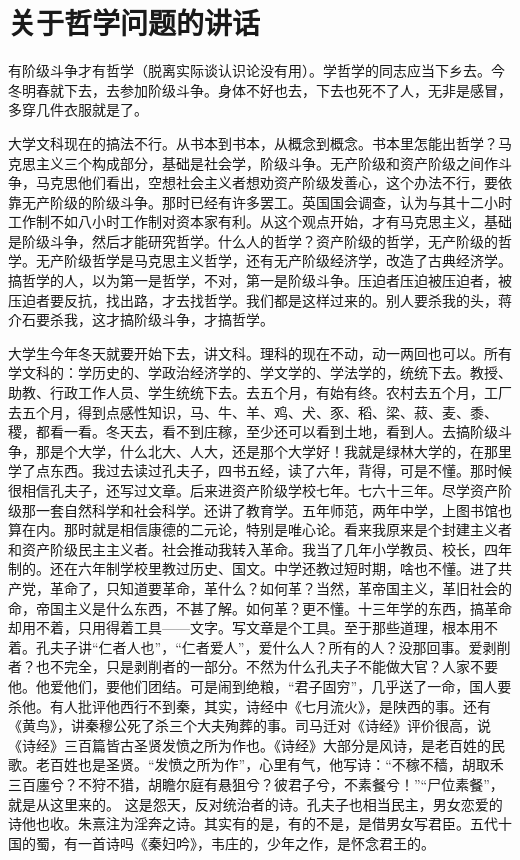 \section[关于哲学问题的讲话（一九六四年八月十八日）]{关于哲学问题的讲话}


有阶级斗争才有哲学（脱离实际谈认识论没有用）。学哲学的同志应当下乡去。今冬明春就下去，去参加阶级斗争。身体不好也去，下去也死不了人，无非是感冒，多穿几件衣服就是了。

大学文科现在的搞法不行。从书本到书本，从概念到概念。书本里怎能出哲学？马克思主义三个构成部分，基础是社会学，阶级斗争。无产阶级和资产阶级之间作斗争，马克思他们看出，空想社会主义者想劝资产阶级发善心，这个办法不行，要依靠无产阶级的阶级斗争。那时已经有许多罢工。英国国会调查，认为与其十二小时工作制不如八小时工作制对资本家有利。从这个观点开始，才有马克思主义，基础是阶级斗争，然后才能研究哲学。什么人的哲学？资产阶级的哲学，无产阶级的哲学。无产阶级哲学是马克思主义哲学，还有无产阶级经济学，改造了古典经济学。搞哲学的人，以为第一是哲学，不对，第一是阶级斗争。压迫者压迫被压迫者，被压迫者要反抗，找出路，才去找哲学。我们都是这样过来的。别人要杀我的头，蒋介石要杀我，这才搞阶级斗争，才搞哲学。

大学生今年冬天就要开始下去，讲文科。理科的现在不动，动一两回也可以。所有学文科的：学历史的、学政治经济学的、学文学的、学法学的，统统下去。教授、助教、行政工作人员、学生统统下去。去五个月，有始有终。农村去五个月，工厂去五个月，得到点感性知识，马、牛、羊、鸡、犬、豕、稻、梁、菽、麦、黍、稷，都看一看。冬天去，看不到庄稼，至少还可以看到土地，看到人。去搞阶级斗争，那是个大学，什么北大、人大，还是那个大学好！我就是绿林大学的，在那里学了点东西。我过去读过孔夫子，四书五经，读了六年，背得，可是不懂。那时候很相信孔夫子，还写过文章。后来进资产阶级学校七年。七六十三年。尽学资产阶级那一套自然科学和社会科学。还讲了教育学。五年师范，两年中学，上图书馆也算在内。那时就是相信康德的二元论，特别是唯心论。看来我原来是个封建主义者和资产阶级民主主义者。社会推动我转入革命。我当了几年小学教员、校长，四年制的。还在六年制学校里教过历史、国文。中学还教过短时期，啥也不懂。进了共产党，革命了，只知道要革命，革什么？如何革？当然，革帝国主义，革旧社会的命，帝国主义是什么东西，不甚了解。如何革？更不懂。十三年学的东西，搞革命却用不着，只用得着工具——文字。写文章是个工具。至于那些道理，根本用不着。孔夫子讲“仁者人也”，“仁者爱人”，爱什么人？所有的人？没那回事。爱剥削者？也不完全，只是剥削者的一部分。不然为什么孔夫子不能做大官？人家不要他。他爱他们，要他们团结。可是闹到绝粮，“君子固穷”，几乎送了一命，国人要杀他。有人批评他西行不到秦，其实，诗经中《七月流火》，是陕西的事。还有《黄鸟》，讲秦穆公死了杀三个大夫殉葬的事。司马迁对《诗经》评价很高，说《诗经》三百篇皆古圣贤发愤之所为作也。《诗经》大部分是风诗，是老百姓的民歌。老百姓也是圣贤。“发愤之所为作”，心里有气，他写诗：“不稼不穑，胡取禾三百廛兮？不狩不猎，胡瞻尔庭有悬狙兮？彼君子兮，不素餐兮！”“尸位素餐”，就是从这里来的。 这是怨天，反对统治者的诗。孔夫子也相当民主，男女恋爱的诗他也收。朱熹注为淫奔之诗。其实有的是，有的不是，是借男女写君臣。五代十国的蜀，有一首诗吗《秦妇吟》，韦庄的，少年之作，是怀念君王的。

